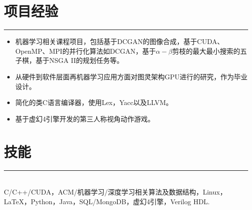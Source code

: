 \documentclass[a4paper]{article}
\begin{document}
		\section*{项目经验}
		\rule[1pt]{18cm}{0.01em}
		\begin{itemize}
		\item 机器学习相关课程项目，包括基于DCGAN的图像合成，基于CUDA、OpenMP、MPI的并行化算法如DCGAN，基于$ \alpha-\beta $剪枝的最大最小搜索的五子棋，基于NSGA II的规划任务等。
		\item 从硬件到软件层面再机器学习应用方面对图灵架构GPU进行的研究，作为毕业设计。
		\item 简化的类C语言编译器，使用Lex，Yacc以及LLVM。 
		\item 基于虚幻4引擎开发的第三人称视角动作游戏。
		\end{itemize}
		\section*{技能}
		\rule[1pt]{18cm}{0.01em}\\
		C/C++/CUDA，ACM/机器学习/深度学习相关算法及数据结构，Linux，\LaTeX，Python，Java，SQL/MongoDB，虚幻4引擎，Verilog HDL.
		
	
\end{document}
